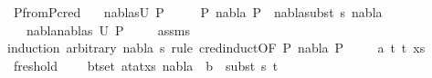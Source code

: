\begin{isabellebody}
\endisatagproof
{\isafoldproof}%
%
\isadelimproof
\isanewline
%
\endisadelimproof
\isanewline
\isanewline
{}\isamarkupfalse%
\ P{}{\isacharunderscore}{\kern0pt}from{\isacharunderscore}{\kern0pt}P{}{\isacharunderscore}{\kern0pt}cred{\isacharcolon}{\kern0pt}\isanewline
\ \ \ {\isachardoublequoteopen}{\isacharparenleft}{\kern0pt}nabla{}{\isacharcomma}{\kern0pt}s{}{\isacharparenright}{\kern0pt}{\isasymin}U\ P{}{\isachardoublequoteclose}\isanewline
\ \ \ \ \ {\isachardoublequoteopen}P{}\ {\isasymturnstile}nabla{}{\isasymrightarrow}\ P{}{\isachardoublequoteclose}\ \ {\isachardoublequoteopen}nabla{}{\isasymTurnstile}{\isacharparenleft}{\kern0pt}subst\ s{}{\isacharparenright}{\kern0pt}\ nabla{}{\isachardoublequoteclose}\isanewline
\ \ \ {\isachardoublequoteopen}{\isacharparenleft}{\kern0pt}nabla{}{\isasymunion}nabla{}{\isacharcomma}{\kern0pt}s{}{\isacharparenright}{\kern0pt}{\isasymin}\ U\ P{}{\isachardoublequoteclose}\ \isanewline
%
\isadelimproof
\ \ %
\endisadelimproof
%
\isatagproof
{}\isamarkupfalse%
\ assms\isanewline
{}\isamarkupfalse%
{\isacharparenleft}{\kern0pt}induction\ arbitrary{\isacharcolon}{\kern0pt}\ nabla{}\ s{}\ rule{\isacharcolon}{\kern0pt}\ c{\isacharunderscore}{\kern0pt}red{\isachardot}{\kern0pt}induct{\isacharbrackleft}{\kern0pt}OF\ {\isacartoucheopen}P{}\ {\isasymturnstile}nabla{}{\isasymrightarrow}\ P{}{\isacartoucheclose}{\isacharbrackright}{\kern0pt}{\isacharparenright}{\kern0pt}\isanewline
\ \ \isamarkupfalse%
\ {\isacharparenleft}{\kern0pt}{}\ a\ t{}\ t{}\ xs{\isacharparenright}{\kern0pt}\isanewline
\ \ \isamarkupfalse%
\ fresh{\isacharunderscore}{\kern0pt}old{\isacharcolon}{\kern0pt}\isanewline
\ \ \ \ {\isachardoublequoteopen}{\isasymforall}{\isacharparenleft}{\kern0pt}b{\isacharcomma}{\kern0pt}t{\isacharparenright}{\kern0pt}{\isasymin}set\ {\isacharparenleft}{\kern0pt}{\isacharparenleft}{\kern0pt}a{\isacharcomma}{\kern0pt}t{}{\isacharparenright}{\kern0pt}{\isacharhash}{\kern0pt}{\isacharparenleft}{\kern0pt}a{\isacharcomma}{\kern0pt}t{}{\isacharparenright}{\kern0pt}{\isacharhash}{\kern0pt}xs{\isacharparenright}{\kern0pt}{\isachardot}{\kern0pt}\ nabla{}\ {\isasymturnstile}\ b\ {\isasymsharp}\ subst\ s{}\ t{\isachardoublequoteclose}\isanewline

\end{isabellebody}
